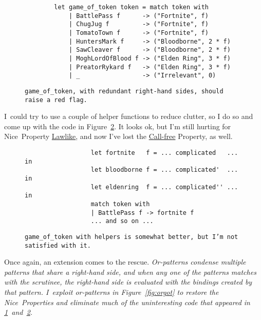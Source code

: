\documentclass[manuscript,screen,review, 12pt, nonacm]{acmart}
\begin{document}
        \begin{figure}
            \begin{center}
                \begin{verbatim}
        let game_of_token token = match token with 
            | BattlePass f      -> ("Fortnite", f)
            | ChugJug f         -> ("Fortnite", f)
            | TomatoTown f      -> ("Fortnite", f)
            | HuntersMark f     -> ("Bloodborne", 2 * f)
            | SawCleaver f      -> ("Bloodborne", 2 * f)
            | MoghLordOfBlood f -> ("Elden Ring", 3 * f)
            | PreatorRykard f   -> ("Elden Ring", 3 * f)
            | _                 -> ("Irrelevant", 0)
                \end{verbatim}
            \end{center}    

        \caption{\tt{game\_of\_token}, with redundant right-hand sides,
        should raise a red flag.} 
        \label{fig:baregot}
        \end{figure}

        I~could try to use a couple of helper functions to reduce clutter, so I
        do so and come up with the code in Figure~\ref{fig:helpergot}. It looks
        ok, but I'm still hurting for Nice~Property \hyperref[p2]{Lawlike}, and
        now I've lost the \hyperref[p3]{Call-free} Property, as well.

        \begin{figure}
            \begin{center}
                \begin{verbatim}
                  let fortnite   f = ... complicated   ... in
                  let bloodborne f = ... complicated'  ... in
                  let eldenring  f = ... complicated'' ... in
                  match token with
                  | BattlePass f -> fortnite f
                  ... and so on ...                
                \end{verbatim}
            \end{center}    
        \caption{\tt{game\_of\_token} with helpers is somewhat better, but I'm
        not satisfied with it.} 
        \label{fig:helpergot}
        \end{figure}

        Once again, an extension comes to the rescue. \it{Or-patterns} condense
        multiple patterns that share a right-hand side, and when any one of the
        patterns matches with the scrutinee, the right-hand side is evaluated
        with the bindings created by that pattern. I~exploit or-patterns in
        Figure~\ref{fig:orgot} to restore the Nice~Properties and eliminate much
        of the uninteresting code that appeared in
        \ref{fig:baregot}~and~\ref{fig:helpergot}. 
\end{document}
